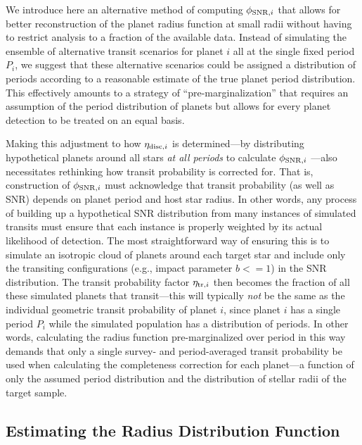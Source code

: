 \documentclass[iop]{emulateapj}
\begin{document}
We introduce here an alternative method of computing $\phi_{{\rm SNR},i}$ that allows for better reconstruction of the planet radius function at small radii without having to restrict analysis to a fraction of the available data.  Instead of simulating the ensemble of alternative transit scenarios for planet $i$ all at the single fixed period $P_i$, we suggest that these alternative scenarios could be assigned a distribution of periods according to a reasonable estimate of the true planet period distribution.  This effectively amounts to a strategy of ``pre-marginalization'' that requires an assumption of the period distribution of planets but allows for every planet detection to be treated on an equal basis. 



Making this adjustment to how $\eta_{{\rm disc},i}$ is determined---by distributing hypothetical planets around all stars \textit{at all periods} to calculate $\phi_{{\rm SNR},i}$ ---also necessitates rethinking how transit probability is corrected for.  That is,  construction of $\phi_{{\rm SNR},i}$ must acknowledge that transit probability (as well as SNR) depends on planet period and host star radius.  In other words, any process of building up a hypothetical SNR distribution from many instances of simulated transits must ensure that each instance is properly weighted by its actual likelihood of detection.  The most straightforward way of ensuring this is to simulate an isotropic cloud of planets around each target star and include only the transiting configurations (e.g., impact parameter $b <= 1$) in the SNR distribution.  The transit probability factor $\eta_{{\rm tr},i}$ then becomes the fraction of all these simulated planets that transit---this will typically \textit{not} be the same as the individual geometric transit probability of planet $i$, since planet $i$ has a single period $P_i$ while the simulated population has a distribution of periods.  In other words, calculating the radius function pre-marginalized over period in this way demands that only a single survey- and period-averaged transit probability be used when calculating the completeness correction for each planet---a function of only the assumed period distribution and the distribution of stellar radii of the target sample.  


\subsection{Estimating the Radius Distribution Function}
\label{sec:radfunction}
\end{document}
